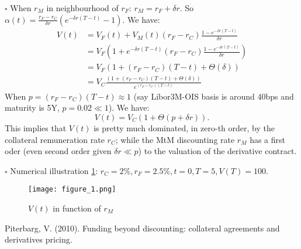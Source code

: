 \documentclass[twoside,twocolumn]{article}
\begin{document}
$\square$ When $r_{M}$ in neighbourhood of $r_{F}$: $r_{M}=r_{F}+\delta r$. So $\alpha(t)=\frac{r_{F}-r_{C}}{\delta r}(e^{-\delta r(T-t)}-1)$. We have:
\begin{align*}
V(t) &= V_{F}(t) + V_{M}(t) (r_{F}-r_{C})\frac{1-e^{-\delta r(T-t)}}{\delta r}\\
&= V_{F} (1+e^{-\delta r(T-t)}(r_{F}-r_{C})\frac{1-e^{-\delta r(T-t)}}{\delta r})\\
&= V_{F} (1+(r_{F}-r_{C})(T-t)+\Theta(\delta))\\
&= V_{C}\frac{(1+(r_{F}-r_{C})(T-t)+\Theta(\delta))}{e^{(r_{F}-r_{C})(T-t)}}
\end{align*}
When $p=(r_{F}-r_{C})(T-t) \approx 1$ (say Libor3M-OIS basis is around 40bps and maturity is 5Y, $p=0.02 \ll 1$). We have:
$$V(t) = V_{C} (1+ \Theta(p+\delta r)).$$
This implies that $V(t)$ is pretty much dominated, in zero-th order, by the collateral remuneration rate $r_{C}$; while the MtM discounting rate $r_{M}$ has a first oder (even second order given $\delta r \ll p$) to the valuation of the derivative contract.

$\square$ Numerical illustration \ref{fig:Vm}: $r_{C}=2\%, r_{F}=2.5\%, t=0, T=5, V(T)=100.$
\begin{figure}
  \texttt{[image: figure\_1.png]}
  \caption{$V(t)$ in function of $r_{M}$}
  \label{fig:Vm}
 \end{figure}



\begin{thebibliography}{99} %

Piterbarg, V. (2010).
\newblock Funding beyond discounting: collateral agreements and derivatives pricing.\\
 
\end{thebibliography}

\end{document}

